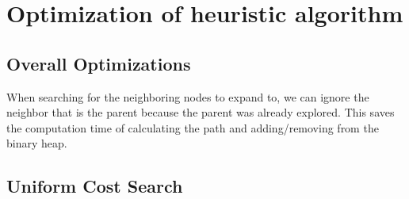 \section{Optimization of heuristic algorithm}

\subsection{Overall Optimizations}

When searching for the neighboring nodes to expand to, we can ignore the neighbor that is the parent because the parent was already explored. This saves the computation time of calculating the path and adding/removing from the binary heap.



\subsection{Uniform Cost Search}